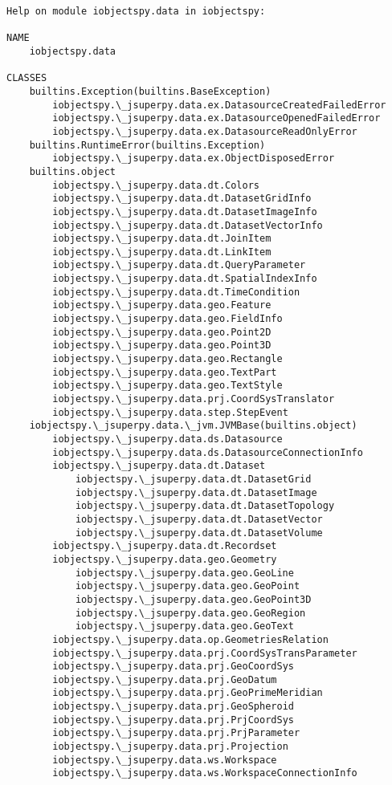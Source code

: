 \documentclass[11pt]{article}
\begin{document}
    \begin{Verbatim}[commandchars=\\\{\}]
Help on module iobjectspy.data in iobjectspy:

NAME
    iobjectspy.data

CLASSES
    builtins.Exception(builtins.BaseException)
        iobjectspy.\_jsuperpy.data.ex.DatasourceCreatedFailedError
        iobjectspy.\_jsuperpy.data.ex.DatasourceOpenedFailedError
        iobjectspy.\_jsuperpy.data.ex.DatasourceReadOnlyError
    builtins.RuntimeError(builtins.Exception)
        iobjectspy.\_jsuperpy.data.ex.ObjectDisposedError
    builtins.object
        iobjectspy.\_jsuperpy.data.dt.Colors
        iobjectspy.\_jsuperpy.data.dt.DatasetGridInfo
        iobjectspy.\_jsuperpy.data.dt.DatasetImageInfo
        iobjectspy.\_jsuperpy.data.dt.DatasetVectorInfo
        iobjectspy.\_jsuperpy.data.dt.JoinItem
        iobjectspy.\_jsuperpy.data.dt.LinkItem
        iobjectspy.\_jsuperpy.data.dt.QueryParameter
        iobjectspy.\_jsuperpy.data.dt.SpatialIndexInfo
        iobjectspy.\_jsuperpy.data.dt.TimeCondition
        iobjectspy.\_jsuperpy.data.geo.Feature
        iobjectspy.\_jsuperpy.data.geo.FieldInfo
        iobjectspy.\_jsuperpy.data.geo.Point2D
        iobjectspy.\_jsuperpy.data.geo.Point3D
        iobjectspy.\_jsuperpy.data.geo.Rectangle
        iobjectspy.\_jsuperpy.data.geo.TextPart
        iobjectspy.\_jsuperpy.data.geo.TextStyle
        iobjectspy.\_jsuperpy.data.prj.CoordSysTranslator
        iobjectspy.\_jsuperpy.data.step.StepEvent
    iobjectspy.\_jsuperpy.data.\_jvm.JVMBase(builtins.object)
        iobjectspy.\_jsuperpy.data.ds.Datasource
        iobjectspy.\_jsuperpy.data.ds.DatasourceConnectionInfo
        iobjectspy.\_jsuperpy.data.dt.Dataset
            iobjectspy.\_jsuperpy.data.dt.DatasetGrid
            iobjectspy.\_jsuperpy.data.dt.DatasetImage
            iobjectspy.\_jsuperpy.data.dt.DatasetTopology
            iobjectspy.\_jsuperpy.data.dt.DatasetVector
            iobjectspy.\_jsuperpy.data.dt.DatasetVolume
        iobjectspy.\_jsuperpy.data.dt.Recordset
        iobjectspy.\_jsuperpy.data.geo.Geometry
            iobjectspy.\_jsuperpy.data.geo.GeoLine
            iobjectspy.\_jsuperpy.data.geo.GeoPoint
            iobjectspy.\_jsuperpy.data.geo.GeoPoint3D
            iobjectspy.\_jsuperpy.data.geo.GeoRegion
            iobjectspy.\_jsuperpy.data.geo.GeoText
        iobjectspy.\_jsuperpy.data.op.GeometriesRelation
        iobjectspy.\_jsuperpy.data.prj.CoordSysTransParameter
        iobjectspy.\_jsuperpy.data.prj.GeoCoordSys
        iobjectspy.\_jsuperpy.data.prj.GeoDatum
        iobjectspy.\_jsuperpy.data.prj.GeoPrimeMeridian
        iobjectspy.\_jsuperpy.data.prj.GeoSpheroid
        iobjectspy.\_jsuperpy.data.prj.PrjCoordSys
        iobjectspy.\_jsuperpy.data.prj.PrjParameter
        iobjectspy.\_jsuperpy.data.prj.Projection
        iobjectspy.\_jsuperpy.data.ws.Workspace
        iobjectspy.\_jsuperpy.data.ws.WorkspaceConnectionInfo
    

\end{Verbatim}
\end{document}
